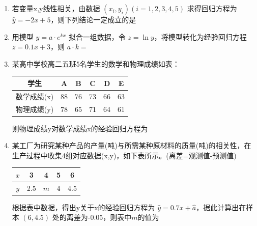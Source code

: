 \begin{enumerate}
\item 若变量x,y线性相关，由数据 $(x_{i},y_{i})(i=1,2,3,4,5)$ 求得回归方程为 $\hat{y}=-2x+5$，则下列结论一定成立的是

\item 用模型 $y=a\cdot e^{kx}$ 拟合一组数据，令 $z=\ln y$，将模型转化为经验回归方程 $z=0.1x+3$，则 $a\cdot k=$

\item 某高中学校高二五班5名学生的数学和物理成绩如表：
\begin{center}
\begin{tabular}{|c|c|c|c|c|c|}
\hline
学生 & A & B & C & D & E \\
\hline
数学成绩(x) & 88 & 76 & 73 & 66 & 63 \\
\hline
物理成绩(y) & 78 & 65 & 71 & 64 & 61 \\
\hline
\end{tabular}
\end{center}
则物理成绩y对数学成绩x的经验回归方程为

\item 某工厂为研究某种产品的产量(吨)与所需某种原材料的质量(吨)的相关性，在生产过程中收集4组对应数据(x,y)，如下表所示。(离差=观测值-预测值)
\begin{center}
\begin{tabular}{|c|c|c|c|c|}
\hline
$x$ & 3 & 4 & 5 & 6 \\
\hline
$y$ & 2.5 & $m$ & 4 & 4.5 \\
\hline
\end{tabular}
\end{center}
根据表中数据，得出y关于x的经验回归方程为 $\hat{y}=0.7x+\hat{a}$，据此计算出在样本 $(6,4.5)$ 处的离差为-0.05，则表中$m$的值为


\end{enumerate}
